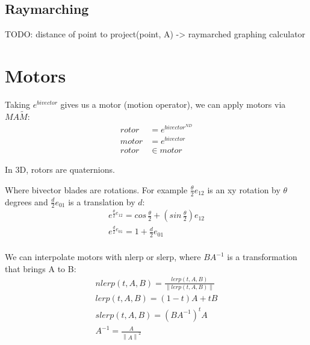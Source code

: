 \documentclass[twoside]{article}
\newcommand{\B}[1]{\left(#1\right)} %
\newcommand{\F}[2]{\frac{#1}{#2}} %
\newcommand{\norm}[1]{{\left\lVert{#1}\right\rVert}}
\newcommand{\aside}[1]{\begin{flushright}\scriptsize{#1}\end{flushright}}
\begin{document}
\begin{multicols*}{2}
            \subsection{Raymarching}
                    TODO: distance of point to project(point, A) -> raymarched graphing calculator \\
            \subsection{}
        \section{Motors}
            \par
                Taking $ e^{bivector} $ gives us a motor (motion operator), we can apply motors via $ M A \tilde{M} $:
                $$\begin{aligned}
                    rotor &= e^{bivector^{ND}} \\
                    motor &= e^{bivector} \\
                    rotor &\in motor
                \end{aligned}$$
                \aside{In 3D, rotors are quaternions.} %
            \par
                Where bivector blades are rotations. For example $ \F{\theta}{2} e_{12} $ is an xy rotation by $ \theta $ degrees
                and $ \F{d}{2} e_{01} $ is a translation by $ d $:
                \begin{gather*}
                    e^{\F{\theta}{2} e_{12}} = cos \,\F{\theta}{2} + \B{sin \,\F{\theta}{2}} e_{12} \\
                    e^{\F{d}{2} e_{01}} = 1 + \F{d}{2} e_{01} \\
                \end{gather*}
            \par
                We can interpolate motors with nlerp or slerp, where $ BA^{-1} $ is a transformation that brings A to B:
                \begin{gather*}
                    nlerp(t, A, B) = \F{lerp(t, A, B)}{\norm{lerp(t, A, B)}} \\
                    lerp(t, A, B) = (1-t) A + t B \\
                    slerp(t, A, B) = (BA^{-1})^t A \\
                    A^{-1} = \F{A}{\norm{A}^2} \\ %

\end{gather*}
\end{multicols*}
\end{document}
